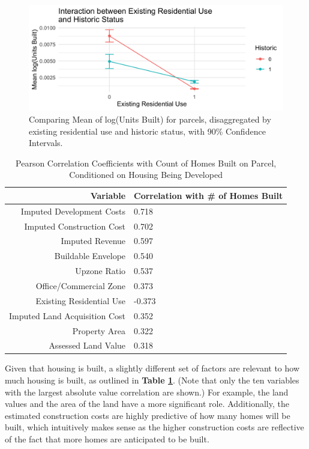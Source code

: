 \documentclass[a4paper,12pt]{article}
\begin{document}
\begin{figure}[hbt]
    \centering
    \includegraphics[scale=.2]{figures/two_way_res_history.png}
    \caption{Comparing Mean of log(Units Built) for parcels, disaggregated by existing residential use and historic status, with 90\% Confidence Intervals.}
    \label{fig:two_way_res_history}
\end{figure}


\begin{table}[ht]
\centering
\setlength{\tabcolsep}{10pt} 
\caption{Pearson Correlation Coefficients with Count of Homes Built on Parcel, Conditioned on Housing Being Developed}
\begin{tabular}{r l}
\hline
\textbf{Variable} & \textbf{Correlation with \# of Homes Built} \\
\hline
          Imputed Development Costs & 0.718 \\
          Imputed Construction Cost & 0.702 \\
          Imputed Revenue & 0.597 \\
          Buildable Envelope  & 0.540 \\
          Upzone Ratio  & 0.537 \\
          Office/Commercial Zone     &  0.373   \\
          Existing Residential Use &  -0.373  \\
           Imputed Land Acquisition Cost &  0.352 \\
            Property Area  & 0.322   \\
           Assessed Land Value         &  0.318  \\
\hline
\end{tabular}
\label{tab:correlation_with_count_homes}
\end{table}



Given that housing is built, a slightly different set of factors are relevant to how much housing is built, as outlined in \textbf{Table \ref{tab:correlation_with_count_homes}}. (Note that only the ten variables with the largest absolute value correlation are shown.) For example, the land values and the area of the land have a more significant role. Additionally, the estimated construction costs are highly predictive of how many homes will be built, which intuitively makes sense as the higher construction costs are reflective of the fact that more homes are anticipated to be built.
\end{document}
